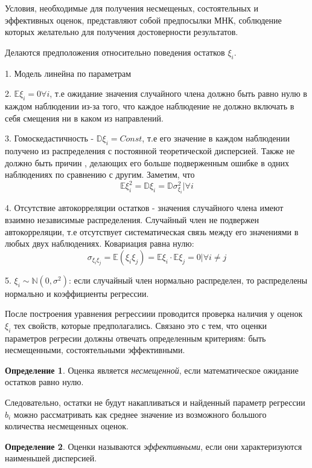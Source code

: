 \documentclass[aps,%
12pt,%
final,%
oneside,
onecolumn,%
musixtex, %
superscriptaddress,%
centertags]{article} %
\theoremstyle{plain}
\theoremstyle{definition}
\newtheorem{definition}{Определение}[subsection]
\theoremstyle{remark}
\begin{document}
Условия, необходимые для получения несмещеных, состоятельных и эффективных оценок, представляют собой предпосылки МНК, соблюдение которых желательно для получения достоверности результатов.

Делаются предположения относительно поведения остатков $\xi_i$.

1. Модель линейна по параметрам

2. $\mathbb{E}\xi_i = 0 \forall i$, т.е ожидание значения случайного члена должно быть равно нулю в каждом наблюдении из-за того, что каждое наблюдение не должно включать в себя смещения ни в каком из направлений.

3. Гомоскедастичность - $\mathbb{D}\xi_i = Const $, т.е его значение в каждом наблюдении получено из распределения с постоянной теоретической дисперсией. Также не должно быть причин , делающих его больше подверженным ошибке в одних наблюдениях по сравнению с другим. Заметим, что $$\mathbb{E}\xi_i^2 = \mathbb{D}\xi_i = \mathbb{D}\sigma_{\xi_i}^2 | \forall i $$

4. Отсутствие автокорреляции остатков - значения случайного члена имеют взаимно независимые распределения. Случайный член не подвержен автокорреляции, т.е отсутствует систематическая связь между его значениями в любых двух наблюдениях.
Ковариация равна нулю:
$$ \sigma_{\xi_{i}\xi_{j}} = \mathbb{E}(\xi_i\xi_j) = \mathbb{E}\xi_i \cdot \mathbb{E}\xi_j = 0 | \forall i \neq j $$

5. $\xi_i \sim \mathbb{N}(0,\sigma^2)$: если случайный член нормально распределен, то распределены нормально и коэффициенты регрессии.

После построения уравнения регрессиии проводится проверка наличия у оценок $\xi_i$ тех свойств, которые предполагались. Связано это с тем, что оценки параметров регресии должны отвечать определенным критериям: быть несмещенными, состоятельными эффективными.

\begin{definition}
	Оценка является \textit{несмещенной}, если математическое ожидание остатков равно нулю.
\end{definition}

Следовательно, остатки не будут накапливаться и найденный параметр регрессии $b_i$ можно рассматривать как среднее значение из возможного большого количества несмещенных оценок.

\begin{definition}
	Оценки называются \textit{эффективными}, если они характеризуются наименьшей дисперсией.
\end{definition}
\end{document}
